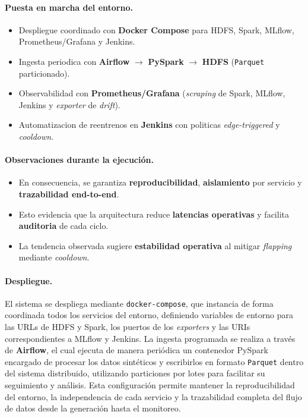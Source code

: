 \paragraph{Puesta en marcha del entorno.}
\begin{itemize}\setlength\itemsep{2pt}
  \item Despliegue coordinado con \textbf{Docker Compose} para HDFS, Spark, MLflow, Prometheus/Grafana y Jenkins.
  \item Ingesta periodica con \textbf{Airflow} $\rightarrow$ \textbf{PySpark} $\rightarrow$ \textbf{HDFS} (\texttt{Parquet} particionado).
  \item Observabilidad con \textbf{Prometheus/Grafana} (\textit{scraping} de Spark, MLflow, Jenkins y \textit{exporter} de \textit{drift}).
  \item Automatizacion de reentrenos en \textbf{Jenkins} con politicas \textit{edge-triggered} y \textit{cooldown}.
\end{itemize}

\paragraph{Observaciones durante la ejecución.}
\begin{itemize}\setlength\itemsep{2pt}
  \item En consecuencia, se garantiza \textbf{reproducibilidad}, \textbf{aislamiento} por servicio y \textbf{trazabilidad end-to-end}.
  \item Esto evidencia que la arquitectura reduce \textbf{latencias operativas} y facilita \textbf{auditoria} de cada ciclo.
  \item La tendencia observada sugiere \textbf{estabilidad operativa} al mitigar \textit{flapping} mediante \textit{cooldown}.
\end{itemize}

\paragraph{Despliegue.}  
El sistema se despliega mediante \texttt{docker-compose}, que instancia de forma coordinada todos los servicios del entorno, definiendo variables de entorno para las URLs de HDFS y Spark, los puertos de los \textit{exporters} y las URIs correspondientes a MLflow y Jenkins.  
La ingesta programada se realiza a través de \textbf{Airflow}, el cual ejecuta de manera periódica un contenedor PySpark encargado de procesar los datos sintéticos y escribirlos en formato \texttt{Parquet} dentro del sistema distribuido, utilizando particiones por lotes para facilitar su seguimiento y análisis.  
Esta configuración permite mantener la reproducibilidad del entorno, la independencia de cada servicio y la trazabilidad completa del flujo de datos desde la generación hasta el monitoreo.

